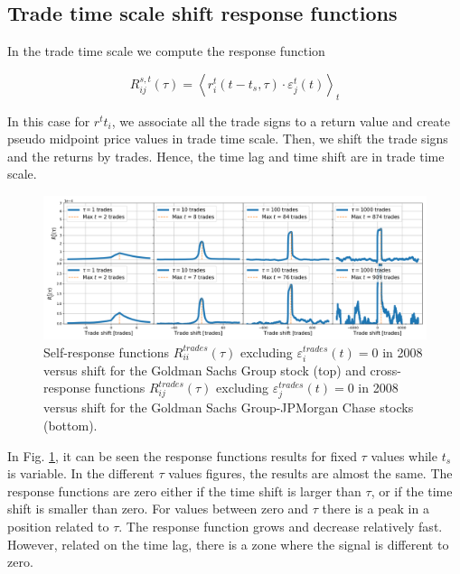\subsection{Trade time scale shift response functions}
\label{subsec:time_shift_trade}

In the trade time scale we compute the response function

\begin{equation}\label{eq:time_shift_trade}
    R_{ij}^{s, t}\left(\tau\right)=\left\langle r^{t}_{i}
    \left(t-t_{s},\tau\right) \cdot\varepsilon^{t}_{j}
    \left(t\right)\right\rangle _{t}
\end{equation}

In this case for $r^t{t}_{i}$, we associate all the trade signs to a return
value and create pseudo midpoint price values in trade time scale. Then, we shift
the trade signs and the returns by trades. Hence, the
time lag and time shift are in trade time scale.

\begin{figure}[htbp]
    \centering
    \includegraphics[width=\textwidth]{figures/04_shift_trade.png}
    \caption{Self-response functions $R_{ii}^{trades}\left(\tau\right)$
             excluding $\varepsilon^{trades}_{i}\left(t\right) = 0$ in 2008
             versus shift for the Goldman Sachs Group stock (top) and
             cross-response functions $R_{ij}^{trades}\left(\tau\right)$
             excluding $\varepsilon^{trades}_{j}\left(t\right) = 0$ in 2008
             versus shift for the Goldman Sachs Group-JPMorgan Chase stocks
             (bottom).}
    \label{fig:shift_trade_scale}
\end{figure}

In Fig. \ref{fig:shift_trade_scale}, it can be seen the response functions results
for fixed $\tau$ values while $t_{s}$ is variable. In the different $\tau$ values
figures, the results are almost the same. The response functions are zero either if the
time shift is larger than $\tau$, or if the time shift is smaller than zero.
For values between zero and $\tau$ there is a peak in a position related to $\tau$.
The response function grows and decrease relatively fast. However, related on the
time lag, there is a zone where the signal is different to zero.

